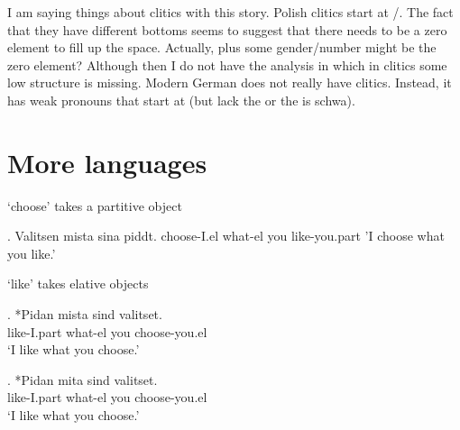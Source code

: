 I am saying things about clitics with this story. Polish clitics start at /. The fact that they have different bottoms seems to suggest that there needs to be a zero element to fill up the space. Actually,  plus some gender/number might be the zero element? Although then I do not have the analysis in which in clitics some low structure is missing. Modern German does not really have clitics. Instead, it has weak pronouns that start at  (but lack the  or the  is schwa).

\section{More languages}

 `choose' takes a partitive object

\ex. Valitsen mista sina piddt.
choose-I.el what-el you like-you.part
'I choose what you like.'

 `like' takes elative objects

\exg. *Pidan mista sind valitset.\\
like-I.part what-el you choose-you.el\\
`I like what you choose.'

\exg. *Pidan mita sind valitset.\\
like-I.part what-el you choose-you.el\\
`I like what you choose.'

\phantom{x}
